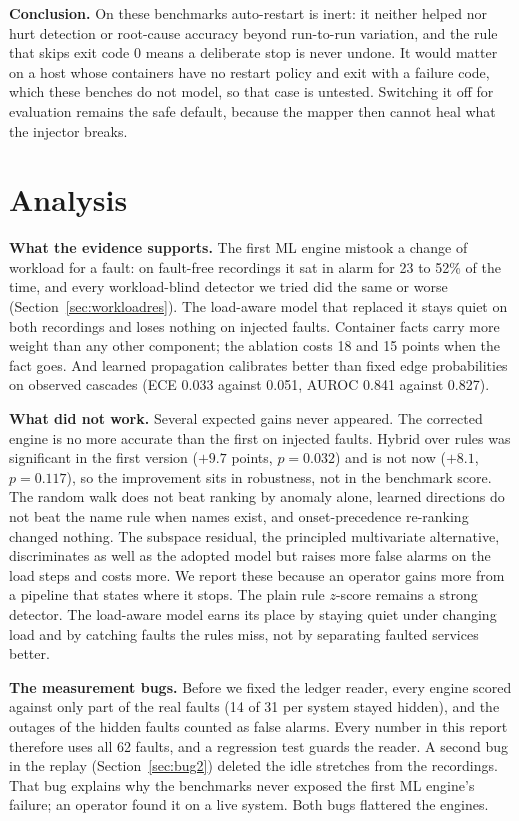 \textbf{Conclusion.} On these benchmarks auto-restart is inert: it neither helped nor hurt detection or root-cause accuracy beyond run-to-run variation, and the rule that skips exit code 0 means a deliberate stop is never undone. It would matter on a host whose containers have no restart policy and exit with a failure code, which these benches do not model, so that case is untested. Switching it off for evaluation remains the safe default, because the mapper then cannot heal what the injector breaks.

\section{Analysis}
\textbf{What the evidence supports.} The first ML engine mistook a change of workload for a fault: on fault-free recordings it sat in alarm for 23 to 52\% of the time, and every workload-blind detector we tried did the same or worse (Section~\ref{sec:workloadres}). The load-aware model that replaced it stays quiet on both recordings and loses nothing on injected faults. Container facts carry more weight than any other component; the ablation costs 18 and 15 points when the  fact goes. And learned propagation calibrates better than fixed edge probabilities on observed cascades (ECE 0.033 against 0.051, AUROC 0.841 against 0.827).

\textbf{What did not work.} Several expected gains never appeared. The corrected engine is no more accurate than the first on injected faults. Hybrid over rules was significant in the first version ($+9.7$ points, $p = 0.032$) and is not now ($+8.1$, $p = 0.117$), so the improvement sits in robustness, not in the benchmark score. The random walk does not beat ranking by anomaly alone, learned directions do not beat the name rule when names exist, and onset-precedence re-ranking changed nothing. The subspace residual, the principled multivariate alternative, discriminates as well as the adopted model but raises more false alarms on the load steps and costs more. We report these because an operator gains more from a pipeline that states where it stops. The plain rule $z$-score remains a strong detector. The load-aware model earns its place by staying quiet under changing load and by catching faults the rules miss, not by separating faulted services better.

\textbf{The measurement bugs.} Before we fixed the ledger reader, every engine scored against only part of the real faults (14 of 31 per system stayed hidden), and the outages of the hidden faults counted as false alarms. Every number in this report therefore uses all 62 faults, and a regression test guards the reader. A second bug in the replay (Section~\ref{sec:bug2}) deleted the idle stretches from the recordings. That bug explains why the benchmarks never exposed the first ML engine's failure; an operator found it on a live system. Both bugs flattered the engines.

